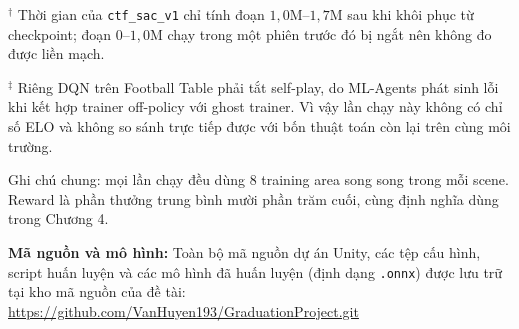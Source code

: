 \begin{table}[H]
\vspace{0.2cm}
{\footnotesize
$^{\dagger}$ Thời gian của \texttt{ctf\_sac\_v1} chỉ tính đoạn $1{,}0$M--$1{,}7$M sau khi khôi phục từ checkpoint; đoạn $0$--$1{,}0$M chạy trong một phiên trước đó bị ngắt nên không đo được liền mạch.

\smallskip
$^{\ddagger}$ Riêng DQN trên Football Table phải tắt self-play, do ML-Agents phát sinh lỗi khi kết hợp trainer off-policy với ghost trainer. Vì vậy lần chạy này không có chỉ số ELO và không so sánh trực tiếp được với bốn thuật toán còn lại trên cùng môi trường.

\smallskip
Ghi chú chung: mọi lần chạy đều dùng $8$ training area song song trong mỗi scene. Reward là
phần thưởng trung bình mười phần trăm cuối, cùng định nghĩa dùng trong Chương 4.}
\end{table}

\vspace{0.5cm}
\noindent\textbf{Mã nguồn và mô hình:} Toàn bộ mã nguồn dự án Unity, các tệp cấu hình,
script huấn luyện và các mô hình đã huấn luyện (định dạng \texttt{.onnx}) được lưu trữ
tại kho mã nguồn của đề tài: \url{https://github.com/VanHuyen193/GraduationProject.git}
